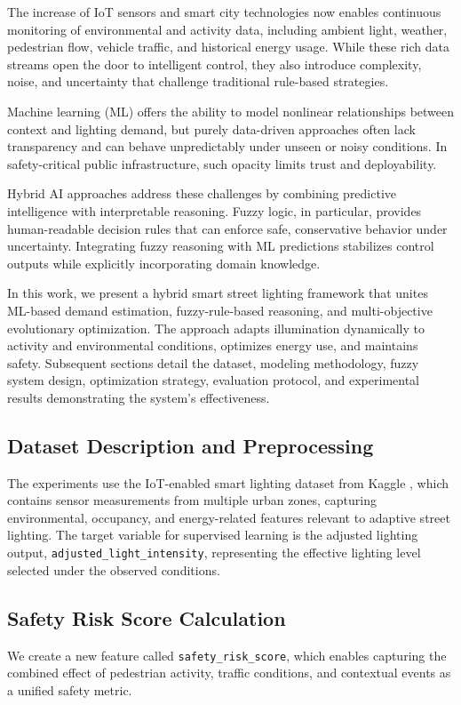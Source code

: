 \documentclass[conference]{IEEEtran}
\begin{document}
The increase of IoT sensors and smart city technologies now enables continuous monitoring of environmental and activity data, including ambient light, weather, pedestrian flow, vehicle traffic, and historical energy usage. While these rich data streams open the door to intelligent control, they also introduce complexity, noise, and uncertainty that challenge traditional rule-based strategies.

Machine learning (ML) offers the ability to model nonlinear relationships between context and lighting demand, but purely data-driven approaches often lack transparency and can behave unpredictably under unseen or noisy conditions. In safety-critical public infrastructure, such opacity limits trust and deployability.

Hybrid AI approaches address these challenges by combining predictive intelligence with interpretable reasoning. Fuzzy logic, in particular, provides human-readable decision rules that can enforce safe, conservative behavior under uncertainty. Integrating fuzzy reasoning with ML predictions stabilizes control outputs while explicitly incorporating domain knowledge.

In this work, we present a hybrid smart street lighting framework that unites ML-based demand estimation, fuzzy-rule-based reasoning, and multi-objective evolutionary optimization. The approach adapts illumination dynamically to activity and environmental conditions, optimizes energy use, and maintains safety. Subsequent sections detail the dataset, modeling methodology, fuzzy system design, optimization strategy, evaluation protocol, and experimental results demonstrating the system’s effectiveness.

\subsection{Dataset Description and Preprocessing}
The experiments use the IoT-enabled smart lighting dataset from Kaggle \cite{smartlighting_dataset}, which contains sensor measurements from multiple urban zones, capturing environmental, occupancy, and energy-related features relevant to adaptive street lighting. The target variable for supervised learning is the adjusted lighting output, \texttt{adjusted\_light\_intensity}, representing the effective lighting level selected under the observed conditions.

\subsection{Safety Risk Score Calculation}
We create a new feature called \texttt{safety\_risk\_score}, which enables capturing the combined effect of pedestrian activity, traffic conditions, and contextual events as a unified safety metric.
\end{document}

